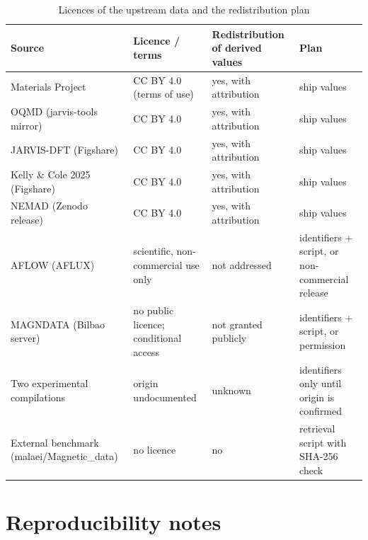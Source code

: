\documentclass[11pt,a4paper]{article}
\begin{document}
\begin{table}
\caption{Licences of the upstream data and the redistribution plan}
\label{tab:tableS10_licences}
\tablefont
\begin{tabularx}{\textwidth}{@{}>{\raggedright\arraybackslash}X>{\raggedright\arraybackslash}X>{\raggedright\arraybackslash}X>{\raggedright\arraybackslash}X@{}}
\toprule
\textbf{Source} & \textbf{Licence / terms} & \textbf{Redistribution of derived values} & \textbf{Plan} \\
\midrule
Materials Project & CC BY 4.0 (terms of use) & yes, with attribution & ship values \\
OQMD (jarvis-tools mirror) & CC BY 4.0 & yes, with attribution & ship values \\
JARVIS-DFT (Figshare) & CC BY 4.0 & yes, with attribution & ship values \\
Kelly \& Cole 2025 (Figshare) & CC BY 4.0 & yes, with attribution & ship values \\
NEMAD (Zenodo release) & CC BY 4.0 & yes, with attribution & ship values \\
AFLOW (AFLUX) & scientific, non-commercial use only & not addressed & identifiers + script, or non-commercial release \\
MAGNDATA (Bilbao server) & no public licence; conditional access & not granted publicly & identifiers + script, or permission \\
Two experimental compilations & origin undocumented & unknown & identifiers only until origin is confirmed \\
External benchmark (malaei/Magnetic\_data) & no licence & no & retrieval script with SHA-256 check \\
\bottomrule
\end{tabularx}
\par\vspace{4pt}
\end{table}



\section*{Reproducibility notes}
\end{document}
